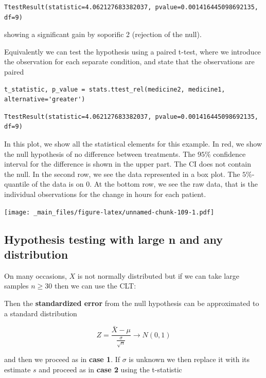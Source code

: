 \documentclass[
]{book}
\begin{document}
\begin{verbatim}
TtestResult(statistic=4.062127683382037, pvalue=0.001416445098692135, df=9)
\end{verbatim}

showing a significant gain by soporific 2 (rejection of the null).

Equivalently we can test the hypothesis using a paired t-test, where we introduce the observation for each separate condition, and state that the observations are paired

\begin{verbatim}
t_statistic, p_value = stats.ttest_rel(medicine2, medicine1, alternative='greater')
\end{verbatim}

\begin{verbatim}
TtestResult(statistic=4.062127683382037, pvalue=0.001416445098692135, df=9)
\end{verbatim}

In this plot, we show all the statistical elements for this example. In red, we show the null hypothesis of no difference between treatments. The \(95\%\) confidence interval for the difference is shown in the upper part. The CI does not contain the null. In the second row, we see the data represented in a box plot. The \(5\%\)-quantile of the data is on \(0\). At the bottom row, we see the raw data, that is the individual observations for the change in hours for each patient.

\texttt{[image: \_main\_files/figure-latex/unnamed-chunk-109-1.pdf]}

\hypertarget{hypothesis-testing-with-large-n-and-any-distribution}{%
\subsection{Hypothesis testing with large n and any distribution}\label{hypothesis-testing-with-large-n-and-any-distribution}}

On many occasions, \(X\) is not normally distributed but if we can take large samples \(n \ge 30\) then we can use the CLT:

Then the \textbf{standardized error} from the null hypothesis can be approximated to a standard distribution

\[Z=\frac{\bar{X}-\mu}{\frac{\sigma}{\sqrt{n}}}  \rightarrow N(0,1)\]

and then we proceed as in \textbf{case 1}. If \(\sigma\) is unknown we then replace it with its estimate \(s\) and proceed as in \textbf{case 2} using the t-statistic
\end{document}
